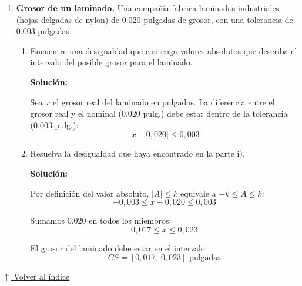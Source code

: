 \documentclass[12pt]{article}
\newcommand{\solucion}{%
    \vspace{0.8em}%
    \textbf{Solución:}%
}
\newcommand{\volverindice}{%
    \vspace{1em}%
    \begin{flushright}%
        \hyperlink{indice}{\small $\uparrow$ Volver al índice}%
    \end{flushright}%
}
\begin{document}
\begin{enumerate}[label=\alph*.-]
    Sumamos 115 en todos los miembros:
    \[
    110 \leq x \leq 120
    \]

    El rango de voltaje doméstico es:
    \[
    \boxed{CS = [110,\ 120] \text{ volts}}
    \]

    \newpage
    \item \textbf{Grosor de un laminado.} Una compañía fabrica laminados industriales (hojas delgadas de nylon) de 0.020 pulgadas de grosor, con una tolerancia de 0.003 pulgadas.

    \begin{enumerate}[label=\roman*)]

        \item Encuentre una desigualdad que contenga valores absolutos que describa el intervalo del posible grosor para el laminado.

        \solucion

        Sea $x$ el grosor real del laminado en pulgadas. La diferencia entre el grosor real y el nominal (0.020 pulg.) debe estar dentro de la tolerancia (0.003 pulg.):
        \[
        \boxed{|x - 0{,}020| \leq 0{,}003}
        \]

        \item Resuelva la desigualdad que haya encontrado en la parte i).

        \solucion

        Por definición del valor absoluto, $|A| \leq k$ equivale a $-k \leq A \leq k$:
        \[
        -0{,}003 \leq x - 0{,}020 \leq 0{,}003
        \]

        Sumamos 0.020 en todos los miembros:
        \[
        0{,}017 \leq x \leq 0{,}023
        \]

        El grosor del laminado debe estar en el intervalo:
        \[
        \boxed{CS = [0{,}017,\ 0{,}023] \text{ pulgadas}}
        \]

    \end{enumerate}

\end{enumerate}

\volverindice
\newpage
\end{document}
